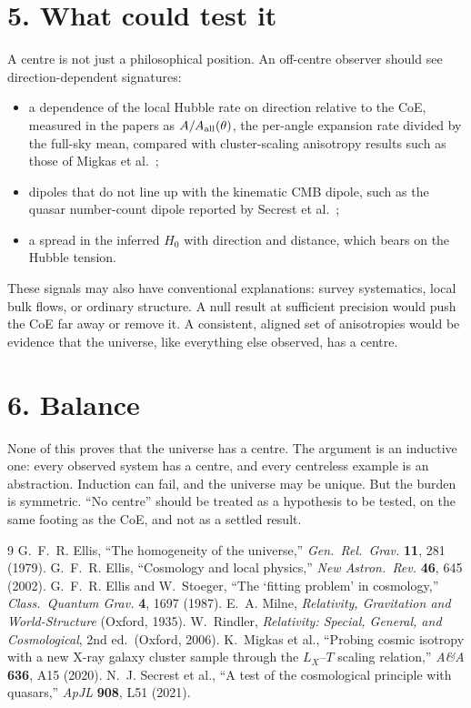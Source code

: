 \documentclass[11pt,a4paper]{article}
\begin{document}
\section*{5. What could test it}
A centre is not just a philosophical position. An off-centre observer should see direction-dependent signatures:
\begin{itemize}
\item a dependence of the local Hubble rate on direction relative to the CoE, measured in the papers as $A/A_{\rm all}(\theta)$, the per-angle expansion rate divided by the full-sky mean, compared with cluster-scaling anisotropy results such as those of Migkas et al.~\cite{migkas};
\item dipoles that do not line up with the kinematic CMB dipole, such as the quasar number-count dipole reported by Secrest et al.~\cite{secrest};
\item a spread in the inferred $H_0$ with direction and distance, which bears on the Hubble tension.
\end{itemize}
These signals may also have conventional explanations: survey systematics, local bulk flows, or ordinary structure. A null result at sufficient precision would push the CoE far away or remove it. A consistent, aligned set of anisotropies would be evidence that the universe, like everything else observed, has a centre.
\section*{6. Balance}
None of this proves that the universe has a centre. The argument is an inductive one: every observed system has a centre, and every centreless example is an abstraction. Induction can fail, and the universe may be unique. But the burden is symmetric. ``No centre'' should be treated as a hypothesis to be tested, on the same footing as the CoE, and not as a settled result.
\begin{thebibliography}{9}
 G.~F.~R. Ellis, ``The homogeneity of the universe,'' \emph{Gen.\ Rel.\ Grav.} \textbf{11}, 281 (1979).
 G.~F.~R. Ellis, ``Cosmology and local physics,'' \emph{New Astron.\ Rev.} \textbf{46}, 645 (2002).
 G.~F.~R. Ellis and W.~Stoeger, ``The `fitting problem' in cosmology,'' \emph{Class.\ Quantum Grav.} \textbf{4}, 1697 (1987).
 E.~A. Milne, \emph{Relativity, Gravitation and World-Structure} (Oxford, 1935).
 W.~Rindler, \emph{Relativity: Special, General, and Cosmological}, 2nd ed.\ (Oxford, 2006).
 K.~Migkas et al., ``Probing cosmic isotropy with a new X-ray galaxy cluster sample through the $L_X$--$T$ scaling relation,'' \emph{A\&A} \textbf{636}, A15 (2020).
 N.~J. Secrest et al., ``A test of the cosmological principle with quasars,'' \emph{ApJL} \textbf{908}, L51 (2021).
\end{thebibliography}
\end{document}

